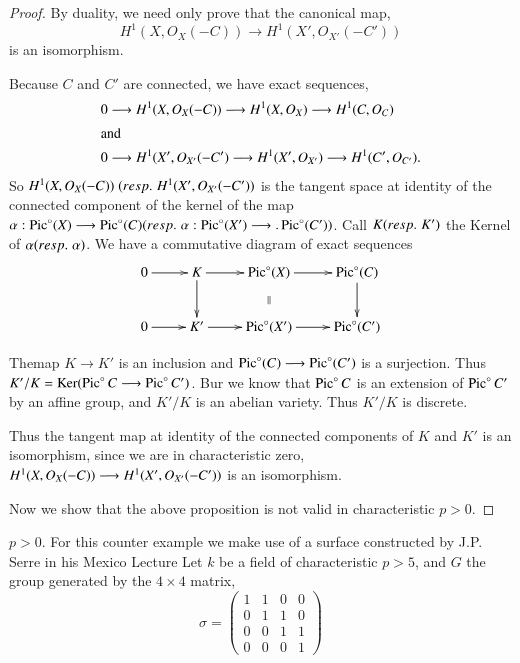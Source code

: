 \begin{proof}
By duality, we need only prove that the canonical map,
$$
H^1(X,O_X(-C))\longrightarrow H^1(X',O_{X'}(-C'))
$$
is an isomorphism.

Because $C$ and $C'$ are connected, we have exact sequences,
\begin{align*}
&0\longrightarrow H^1(X,O_X(-C))\longrightarrow H^1(X,O_X)
\longrightarrow H^1(C,O_C)\\
\intertext{and}
&0\longrightarrow H^1(X',O_{X'}(-C')\longrightarrow H^1(X',O_{X'})
\longrightarrow H^1(C',O_{C'}).
\end{align*}
So $H^1(X,O_X(-C))\;({resp.}\kern.3em H^1({X'},O_{X'}(-C'))$ is the tangent space
at identity of the connected component of the kernel of the map
$\alpha :\operatorname{Pic}^\circ(X)\longrightarrow\operatorname{Pic}^\circ(C)({resp.}\kern.3em\alpha
:\operatorname{Pic}^\circ(X')\longrightarrow .\operatorname{Pic}^\circ(C'))$. Call $K({resp.}\kern.3em K')$
the Kernel of $\alpha({resp.}\kern.3em \alpha)$. We have a commutative diagram of
exact sequences 
\[
\xymatrix{
0 \ar[r] & K \ar[d] \ar[r] & \Pic^\circ(X) \ar[r] \ar @{} [d]
|{\|} & \Pic^\circ(C) \ar[d]\\
0 \ar[r] & K' \ar[r] & \Pic^\circ(X') \ar[r] & \Pic^\circ(C')
}
\] 

The\pageoriginale map $K\longrightarrow K'$ is an inclusion and
$\operatorname{Pic}^\circ(C)\longrightarrow\operatorname{Pic}^\circ(C')$ is a surjection. Thus
$K'/K=\operatorname{Ker}(\operatorname{Pic}^\circ C\longrightarrow\operatorname{Pic}^\circ C')$. Bur we know
that $\operatorname{Pic}^\circ C$ is an extension of $\operatorname{Pic}^\circ C'$ by an affine
group, and $K'/K$ is an abelian variety. Thus $K'/K$ is discrete.

Thus the tangent map at identity of the connected components of $K$
and $K'$ is an isomorphism, since we are in characteristic zero, \ie
$H^1(X,\break O_X(-C))\longrightarrow H^1(X',O_{X'}(-C'))$ is an
isomorphism. 

Now we show that the above proposition is not valid in characteristic
$p>0$.
\end{proof}

 $p>0$. For this
counter example we make use of a surface constructed by J.P. Serre in
his Mexico Lecture \cite{key15} Let $k$ be a field of characteristic
$p>5$, and $G$ the group generated by the $4\times 4$ matrix,  
\begin{equation*}
\sigma=
\begin{pmatrix}
1 & 1 & 0 & 0\\
0 & 1 & 1 & 0\\
0 & 0 & 1 & 1\\
0 & 0 & 0 & 1
\end{pmatrix}
\end{equation*}

